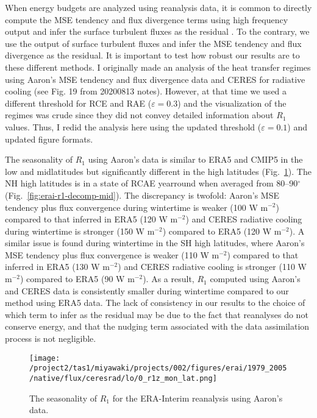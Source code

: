 \documentclass{article}
\begin{document}
When energy budgets are analyzed using reanalysis data, it is common to directly compute the MSE tendency and flux divergence terms using high frequency output and infer the surface turbulent fluxes as the residual \citep[e.g.,][]{donohoe2013}. To the contrary, we use the output of surface turbulent fluxes and infer the MSE tendency and flux divergence as the residual. It is important to test how robust our results are to these different methods. I originally made an analysis of the heat transfer regimes using Aaron's MSE tendency and flux divergence data and CERES for radiative cooling (see Fig. 19 from 20200813 notes). However, at that time we used a different threshold for RCE and RAE ($\varepsilon=0.3$) and the visualization of the regimes was crude since they did not convey detailed information about $R_1$ values. Thus, I redid the analysis here using the updated threshold ($\varepsilon=0.1$) and updated figure formats.

The seasonality of $R_1$ using Aaron's data is similar to ERA5 and CMIP5 in the low and midlatitudes but significantly different in the high latitudes (Fig.~\ref{fig:erai-r1-dev}). The NH high latitudes is in a state of RCAE yearround when averaged from 80--90$^\circ$ (Fig.~\ref{fig:erai-r1-decomp-mid}). The discrepancy is twofold: Aaron's MSE tendency plus flux convergence during wintertime is weaker (100 W m$^{-2}$) compared to that inferred in ERA5 (120 W m$^{-2}$) and CERES radiative cooling during wintertime is stronger (150 W m$^{-2}$) compared to ERA5 (120 W m$^{-2}$). A similar issue is found during wintertime in the SH high latitudes, where Aaron's MSE tendency plus flux convergence is weaker (110 W m$^{-2}$) compared to that inferred in ERA5 (130 W m$^{-2}$) and CERES radiative cooling is stronger (110 W m$^{-2}$) compared to ERA5 (90 W m$^{-2}$). As a result, $R_1$ computed using Aaron's and CERES data is consistently smaller during wintertime compared to our method using ERA5 data. The lack of consistency in our results to the choice of which term to infer as the residual may be due to the fact that reanalyses do not conserve energy, and that the nudging term associated with the data assimilation process is not negligible. 

\begin{figure}[t]
  \noindent\texttt{[image: /project2/tas1/miyawaki/projects/002/figures/erai/1979\_2005/native/flux/ceresrad/lo/0\_r1z\_mon\_lat.png]}\\
  \caption{The seasonality of $R_{1}$ for the ERA-Interim reanalysis using Aaron's data.}
  \label{fig:erai-r1-dev}
\end{figure}
\end{document}
